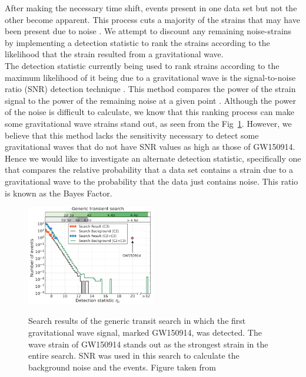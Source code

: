 \documentclass{article}
\begin{document}
    After making the necessary time shift, events present in one data set but not the other become apparent. This process cuts a majority of the strains that may have been present due to noise \cite{DetectionPaper}. We attempt to discount any remaining noise-strains by implementing a detection statistic to rank the strains according to the likelihood that the strain resulted from a gravitational wave.\\
  
  
  \indent The detection statistic currently being used to rank strains according to the maximum likelihood of it being due to a gravitational wave is the signal-to-noise ratio (SNR) detection technique \cite{Enia}. This method compares the power of the strain signal to the power of the remaining noise at a given point \cite{RSmith}. Although the power of the noise is difficult to calculate, we know that this ranking process can make some gravitational wave strains stand out, as seen from the Fig~\ref{Fig:Detection}.  However, we believe that this method lacks the sensitivity necessary to detect some gravitational waves that do not have SNR values as high as those of GW150914. Hence we would like to investigate an alternate detection statistic, specifically one that compares the relative probability that a data set contains a strain due to a gravitational wave to the probability that the data just contains noise. This ratio is known as the Bayes Factor. %
  
\begin{figure}[h]
	\caption{Search results of the generic transit search in which the first gravitational wave signal, marked GW150914, was detected. The wave strain of GW150914 stands out as the strongest strain in the entire search. SNR was used in this search to calculate the background noise and the events. Figure taken from \cite{DetectionPaper}}
	\centering
	\includegraphics[width=0.5\textwidth]{DetectionInGenericTransientSearch} \label{Fig:Detection}
\end{figure}
\end{document}
